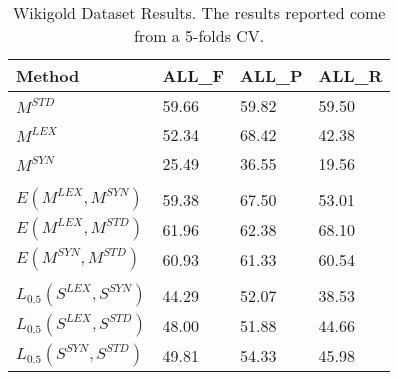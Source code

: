 \begin{table*}[]
\centering
\begin{tabular}{@{}llll@{}}
\toprule
\textbf{Method} & \textbf{ALL\_F} & \textbf{ALL\_P} & \textbf{ALL\_R}\\ \midrule
$M^{STD}$                    & 59.66 & 59.82 & 59.50  \\ 
$M^{LEX}$                    & 52.34 & 68.42 & 42.38 \\
$M^{SYN}$                    & 25.49 & 36.55 & 19.56 \\
                             &       &       &       \\
$E(M^{LEX}, M^{SYN})$        & 59.38 & 67.50  & 53.01 \\
$E(M^{LEX}, M^{STD})$        & 61.96 & 62.38 & 68.10 \\
$E(M^{SYN}, M^{STD})$        & 60.93 & 61.33 & 60.54 \\
                             &       &       &       \\
$L_{0.5}(S^{LEX}, S^{SYN})$  & 44.29 & 52.07 & 38.53 \\
$L_{0.5}(S^{LEX}, S^{STD})$  & 48.00   & 51.88 & 44.66 \\
$L_{0.5}(S^{SYN}, S^{STD})$  & 49.81 & 54.33 & 45.98 \\ \bottomrule
\end{tabular} 
\caption{Wikigold Dataset Results. The results reported come from a 5-folds CV.}
\label{tab:wikigold}
\end{table*}





